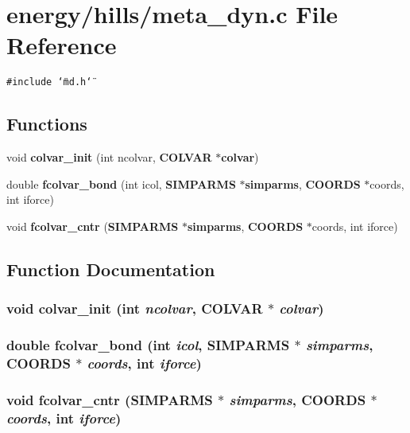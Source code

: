 \section{energy/hills/meta\_\-dyn.c File Reference}
\label{meta__dyn_8c}
{\tt \#include \char`\"{}md.h\char`\"{}}\par
\subsection*{Functions}
\begin{CompactItemize}
\item 
void {\bf colvar\_\-init} (int ncolvar, {\bf COLVAR} $\ast${\bf colvar})
\item 
double {\bf fcolvar\_\-bond} (int icol, {\bf SIMPARMS} $\ast${\bf simparms}, {\bf COORDS} $\ast$coords, int iforce)
\item 
void {\bf fcolvar\_\-cntr} ({\bf SIMPARMS} $\ast${\bf simparms}, {\bf COORDS} $\ast$coords, int iforce)
\end{CompactItemize}


\subsection{Function Documentation}
\subsubsection{\setlength{\rightskip}{0pt plus 5cm}void colvar\_\-init (int {\em ncolvar}, {\bf COLVAR} $\ast$ {\em colvar})}\label{meta__dyn_8c_aff91b1e6b0c1f6d7897cc0ac3ffe458}


\subsubsection{\setlength{\rightskip}{0pt plus 5cm}double fcolvar\_\-bond (int {\em icol}, {\bf SIMPARMS} $\ast$ {\em simparms}, {\bf COORDS} $\ast$ {\em coords}, int {\em iforce})}\label{meta__dyn_8c_b783a4714d9e5e3b8607ea049f858728}


\subsubsection{\setlength{\rightskip}{0pt plus 5cm}void fcolvar\_\-cntr ({\bf SIMPARMS} $\ast$ {\em simparms}, {\bf COORDS} $\ast$ {\em coords}, int {\em iforce})}\label{meta__dyn_8c_dc2e0743e98245d5d4ad8f02ed3bd11e}


